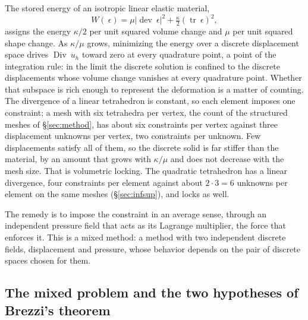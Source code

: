 \documentclass[11pt]{article}
\newcommand{\eps}{~\epsilon}
\newcommand{\Div}{\operatorname{Div}}
\newcommand{\dev}{\operatorname{dev}}
\newcommand{\trace}{\operatorname{tr}}
\theoremstyle{definition}
\theoremstyle{plain}
\begin{document}
The stored energy of an isotropic linear elastic material,
\begin{equation}
  \label{eq:smallenergy}
  W(\eps) = \mu \lvert \dev\eps \rvert^2 + \tfrac{\kappa}{2} (\trace\eps)^2 ,
\end{equation}
assigns the energy $\kappa/2$ per unit squared volume change and $\mu$ per
unit squared shape change. As $\kappa/\mu$ grows, minimizing the energy over
a discrete displacement space drives $\Div ~u_h$ toward zero at every
quadrature point, a point of the integration rule: in the limit the
discrete solution is confined to the discrete displacements whose volume
change vanishes at every quadrature point. Whether that subspace is rich
enough to represent the deformation is a matter of counting. The divergence
of a linear tetrahedron is constant, so each element imposes one constraint;
a mesh with six tetrahedra per vertex, the count of the structured meshes of
\S\ref{sec:method}, has about six constraints per vertex against three
displacement unknowns per vertex, two constraints per unknown. Few
displacements satisfy all of them, so the discrete solid is far stiffer than
the material, by an amount that grows with $\kappa/\mu$ and does not
decrease with the mesh size. That is volumetric locking. The quadratic
tetrahedron has a linear divergence, four constraints per element against
about $2 \cdot 3 = 6$ unknowns per element on the same meshes
(\S\ref{sec:infsup}), and locks as well.

The remedy is to impose the constraint in an average sense, through an
independent pressure field that acts as its Lagrange multiplier, the
force that enforces it. This is a mixed method: a method with two
independent discrete fields, displacement and pressure, whose behavior
depends on the pair of discrete spaces chosen for them.

\subsection{The mixed problem and the two hypotheses of Brezzi's theorem}
\label{sec:mixed}
\end{document}
